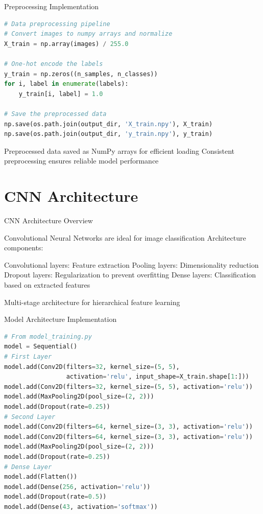 \documentclass{beamer}
\begin{document}
\begin{frame}{Preprocessing Implementation}
\begin{lstlisting}[language=Python]
# Data preprocessing pipeline
# Convert images to numpy arrays and normalize
X_train = np.array(images) / 255.0

# One-hot encode the labels
y_train = np.zeros((n_samples, n_classes))
for i, label in enumerate(labels):
    y_train[i, label] = 1.0

# Save the preprocessed data
np.save(os.path.join(output_dir, 'X_train.npy'), X_train)
np.save(os.path.join(output_dir, 'y_train.npy'), y_train)
\end{lstlisting}

\begin{itemize}
    Preprocessed data saved as NumPy arrays for efficient loading
    Consistent preprocessing ensures reliable model performance
\end{itemize}
\end{frame}

\section{CNN Architecture}

\begin{frame}{CNN Architecture Overview}
\begin{itemize}
    Convolutional Neural Networks are ideal for image classification
    Architecture components:
    \begin{itemize}
        Convolutional layers: Feature extraction
        Pooling layers: Dimensionality reduction
        Dropout layers: Regularization to prevent overfitting
        Dense layers: Classification based on extracted features
    \end{itemize}
    Multi-stage architecture for hierarchical feature learning
\end{itemize}
\end{frame}

\begin{frame}{Model Architecture Implementation}
\begin{lstlisting}[language=Python]
# From model_training.py
model = Sequential()
# First Layer
model.add(Conv2D(filters=32, kernel_size=(5, 5), 
                 activation='relu', input_shape=X_train.shape[1:]))
model.add(Conv2D(filters=32, kernel_size=(5, 5), activation='relu'))
model.add(MaxPooling2D(pool_size=(2, 2)))
model.add(Dropout(rate=0.25))
# Second Layer 
model.add(Conv2D(filters=64, kernel_size=(3, 3), activation='relu'))
model.add(Conv2D(filters=64, kernel_size=(3, 3), activation='relu'))
model.add(MaxPooling2D(pool_size=(2, 2)))
model.add(Dropout(rate=0.25))
# Dense Layer
model.add(Flatten())
model.add(Dense(256, activation='relu'))
model.add(Dropout(rate=0.5))
model.add(Dense(43, activation='softmax'))
\end{lstlisting}
\end{frame}
\end{document}
